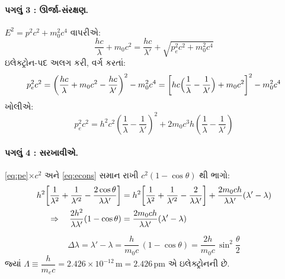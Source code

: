 \paragraph{પગલું 3 : ઊર્જા-સંરક્ષણ.}  $E^{2}=p^{2}c^{2}+m_0^{2}c^{4}$ વાપરીએ:
\begin{equation}
  \frac{hc}{\lambda}+m_0c^{2}=\frac{hc}{\lambda'}+\sqrt{p_e^{2}c^{2}+m_0^{2}c^{4}}
\end{equation}
ઇલેક્ટ્રોન-પદ અલગ કરી, વર્ગ કરતાં:
\begin{equation}
  p_e^{2}c^{2}=\left(\frac{hc}{\lambda}+m_0c^{2}-\frac{hc}{\lambda'}\right)^{2}-m_0^{2}c^{4}
  =\left[h c\Bigl(\frac{1}{\lambda}-\frac{1}{\lambda'}\Bigr)+m_0c^{2}\right]^{2}-m_0^{2}c^{4}
\end{equation}
ખોલીએ:
\begin{equation}
  p_e^{2}c^{2}=h^{2}c^{2}\left(\frac{1}{\lambda}-\frac{1}{\lambda'}\right)^{2}
  +2m_0c^{3}h\left(\frac{1}{\lambda}-\frac{1}{\lambda'}\right)
  \label{eq:econs}
\end{equation}

\paragraph{પગલું 4 : સરખાવીએ.} \eqref{eq:pe}$\times c^2$ અને \eqref{eq:econs} સમાન રાખી
$c^{2}(1-\cos\theta)$ થી ભાગો:
\begin{align}
  h^{2}\!\left[\frac{1}{\lambda^{2}}+\frac{1}{\lambda'^{2}}-\frac{2\cos\theta}{\lambda\lambda'}\right]
  &=h^{2}\!\left[\frac{1}{\lambda^{2}}+\frac{1}{\lambda'^{2}}-\frac{2}{\lambda\lambda'}\right]
   +\frac{2m_0ch}{\lambda\lambda'}(\lambda'-\lambda)\notag\\
  \Rightarrow\quad \frac{2h^{2}}{\lambda\lambda'}(1-\cos\theta)&=\frac{2m_0ch}{\lambda\lambda'}
  (\lambda'-\lambda)\notag
\end{align}

\begin{niyam}[કૉમ્પ્ટન વિસ્થાપન સૂત્ર]
\begin{equation}
  \boxed{\;\Delta\lambda=\lambda'-\lambda=\frac{h}{m_0c}\,(1-\cos\theta)
  =\frac{2h}{m_0c}\,\sin^{2}\!\frac{\theta}{2}\;}
\end{equation}
જ્યાં $\Lambda\equiv\dfrac{h}{m_ec}=2.426\times10^{-12}\,\mathrm{m}=2.426\,$pm એ ઇલેક્ટ્રોનની
 છે.
\end{niyam}


